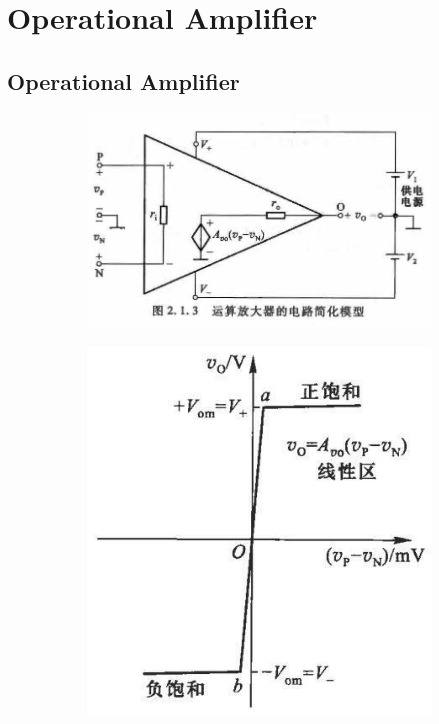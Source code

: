 \chapter{Operational Amplifier}

\section{Operational Amplifier}

\begin{figure}[H]
  \centering
  \begin{subfigure}{.45\textwidth}
    \centering
    \includegraphics[width=\linewidth]{figures/comparator}
  \end{subfigure}
  \begin{subfigure}{.5\textwidth}
    \centering
    \includegraphics[width=0.6\linewidth]{figures/comparator-voltage-change}
  \end{subfigure}
\end{figure}

